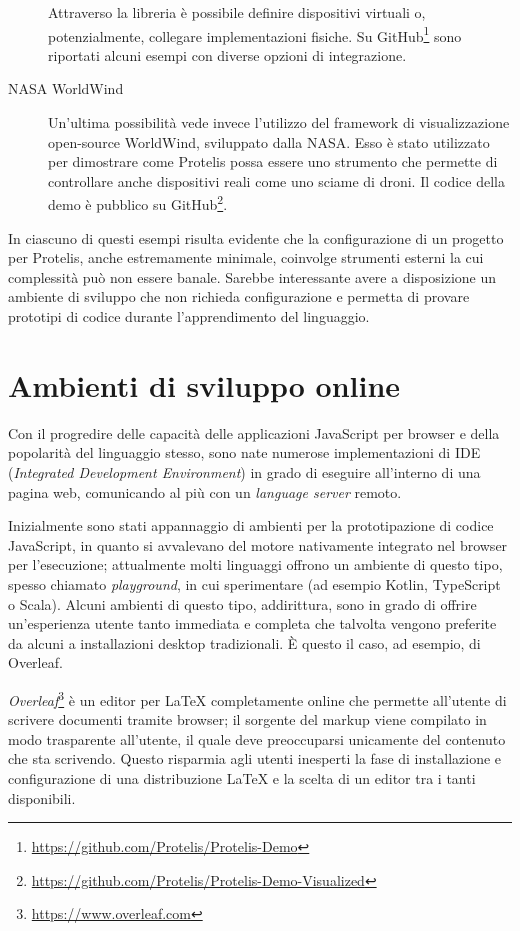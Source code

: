 \begin{description}
      Attraverso la libreria è possibile definire dispositivi virtuali o, potenzialmente, collegare implementazioni fisiche.
      Su GitHub\footnote{\url{https://github.com/Protelis/Protelis-Demo}} sono riportati alcuni esempi con diverse opzioni di integrazione.

    \item[NASA WorldWind]\cite{4161692}
      Un'ultima possibilità vede invece l'utilizzo del framework di visualizzazione open-source WorldWind, sviluppato dalla NASA\@.
      Esso è stato utilizzato per dimostrare come Protelis possa essere uno strumento che permette di controllare anche dispositivi reali come uno sciame di droni.
      Il codice della demo è pubblico su GitHub\footnote{\url{https://github.com/Protelis/Protelis-Demo-Visualized}}.
  \end{description}

  In ciascuno di questi esempi risulta evidente che la configurazione di un progetto per Protelis, anche estremamente minimale, coinvolge strumenti esterni la cui complessità può non essere banale.
  Sarebbe interessante avere a disposizione un ambiente di sviluppo che non richieda configurazione e permetta di provare prototipi di codice durante l'apprendimento del linguaggio.

  \section{Ambienti di sviluppo online}\label{subsec:online-ide}

  Con il progredire delle capacità delle applicazioni JavaScript per browser e della popolarità del linguaggio stesso, sono nate numerose implementazioni di IDE (\emph{Integrated Development Environment}) in grado di eseguire all'interno di una pagina web, comunicando al più con un \emph{language server} remoto.

  Inizialmente sono stati appannaggio di ambienti per la prototipazione di codice JavaScript, in quanto si avvalevano del motore nativamente integrato nel browser per l'esecuzione;
  attualmente molti linguaggi offrono un ambiente di questo tipo, spesso chiamato \emph{playground}, in cui sperimentare (ad esempio Kotlin, TypeScript o Scala).
  Alcuni ambienti di questo tipo, addirittura, sono in grado di offrire un'esperienza utente tanto immediata e completa che talvolta vengono preferite da alcuni a installazioni desktop tradizionali.
  È questo il caso, ad esempio, di Overleaf.

  \emph{Overleaf}\footnote{\url{https://www.overleaf.com}} è un editor per \LaTeX{} completamente online che permette all'utente di scrivere documenti tramite browser;
  il sorgente del markup viene compilato in modo trasparente all'utente, il quale deve preoccuparsi unicamente del contenuto che sta scrivendo.
  Questo risparmia agli utenti inesperti la fase di installazione e configurazione di una distribuzione \LaTeX{} e la scelta di un editor tra i tanti disponibili.

